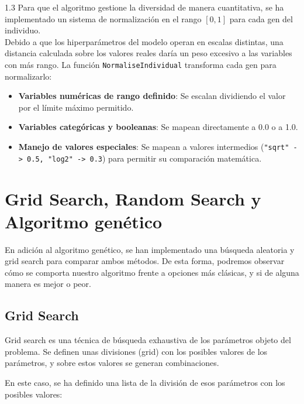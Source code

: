 \documentclass{article}
\begin{document}
\begin{spacing}{1.3}
Para que el algoritmo gestione la diversidad de manera cuantitativa, se ha implementado un sistema de normalización en el rango $[0,1]$ para cada gen del individuo.\\

Debido a que los hiperparámetros del modelo operan en escalas distintas, una distancia calculada sobre los valores reales daría un peso excesivo a las variables con más rango. La función \texttt{NormaliseIndividual} transforma cada gen para normalizarlo:

\begin{itemize}
  \item \textbf{Variables numéricas de rango definido}: Se escalan dividiendo el valor por el límite máximo permitido.
  \item \textbf{Variables categóricas y booleanas}: Se mapean directamente a 0.0 o a 1.0.
  \item \textbf{Manejo de valores especiales}: Se mapean a valores intermedios (\texttt{"sqrt" -> 0.5, "log2" -> 0.3}) para permitir su comparación matemática.
\end{itemize}



\section{Grid Search, Random Search y Algoritmo genético}

En adición al algoritmo genético, se han implementado una búsqueda aleatoria y grid search para
comparar ambos métodos. De esta forma, podremos observar cómo se comporta nuestro algoritmo frente
a opciones más clásicas, y si de alguna manera es mejor o peor. 


\subsection{Grid Search}
Grid search es una técnica de búsqueda exhaustiva de los parámetros objeto del problema.
Se definen unas divisiones (grid) con los posibles valores de los parámetros, y sobre estos valores
se generan combinaciones.\newline

En este caso, se ha definido una lista de la división de esos parámetros con los posibles valores:


        
       

\end{spacing}
\end{document}
